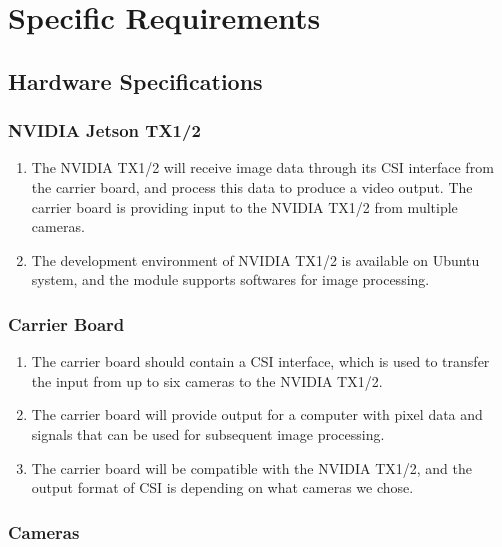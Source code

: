 \documentclass[letterpaper,10pt,serif,draftclsnofoot,onecolumn,compsoc,titlepage]{IEEEtran}
\begin{document}
\section{Specific Requirements}

\subsection{Hardware Specifications}

\subsubsection{NVIDIA Jetson TX1/2}

\begin{enumerate}[label=\alph*]
	\item The NVIDIA TX1/2 will receive image data through its CSI interface from
	the carrier board, and process this data to produce a video output. The carrier
	board is providing input to the NVIDIA TX1/2 from multiple cameras. \\
	\item The development environment of NVIDIA TX1/2 is available on Ubuntu system, and the 
	module supports softwares for image processing.\\
\end{enumerate}

\subsubsection{Carrier Board}

\begin{enumerate}[label=\alph*]
	\item The carrier board should contain a CSI interface, which is used to transfer the
	input from up to six cameras to the NVIDIA TX1/2. \\
	\item The carrier board will provide output for a computer with pixel data and signals that 
	can be used for subsequent image processing.\\
	\item The carrier board will be compatible with the NVIDIA TX1/2, and the output format of 
	CSI is depending on what cameras we chose.\\
\end{enumerate}

\subsubsection{Cameras}
\end{document}
